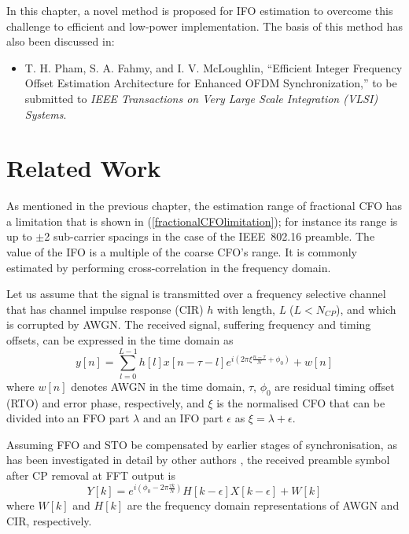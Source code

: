 In this chapter, a novel method is proposed for IFO estimation to overcome this challenge to efficient and low-power implementation. The basis of this method has also been discussed in:
\begin{itemize}
\item T. H. Pham, S. A. Fahmy, and I. V. McLoughlin, ``Efficient Integer Frequency Offset Estimation Architecture for Enhanced OFDM Synchronization,'' to be submitted to \textit{IEEE Transactions on Very Large Scale Integration (VLSI) Systems}.
\end{itemize}

\section{Related Work}
As mentioned in the previous chapter, the estimation range of  fractional CFO has a limitation that is shown in (\ref{fractionalCFOlimitation}); for instance its range is up to $\pm$2 sub-carrier spacings in the case of the IEEE~802.16 preamble. The value of the IFO is a multiple of the coarse CFO's range.
It is commonly estimated by performing cross-correlation \cite{Bang2001,Kim2008} in the frequency domain. 

Let us assume that the signal is transmitted over a frequency selective channel that has channel impulse response (CIR) $h$ with length, \emph{L} ($L<N_{CP}$), and which is corrupted by AWGN. 
The received signal, suffering frequency and timing offsets, can be expressed in the time domain as
\begin{equation}
\label{xnfull}
y[n] = \sum_{l=0}^{L-1} h[l]x[n-\tau-l] e^{i(2\pi \xi \frac{n-\tau}{N} + \phi_0)} + w[n]
\end{equation}
where $w[n]$ denotes AWGN in the time domain, $\tau$, $\phi_0$ are residual timing offset (RTO) and error phase, respectively, and $\xi$ is the normalised CFO that can be divided into an FFO part $\lambda$ and an IFO part $\epsilon$ as $\xi=\lambda+\epsilon$.

Assuming FFO and STO be compensated by earlier stages of synchronisation, as has been investigated in detail by other authors \cite{Kim2008,Pham2014}, the received preamble symbol after CP removal at FFT output is
\begin{equation}
\label{xnrec}
Y[k] =  e^{i(\phi_0-2\pi \frac{\tau k}{N})} H[k-\epsilon] X[k-\epsilon] + W[k]
\end{equation}
where $W[k]$ and $H[k]$ are the frequency domain representations of AWGN and CIR, respectively.

